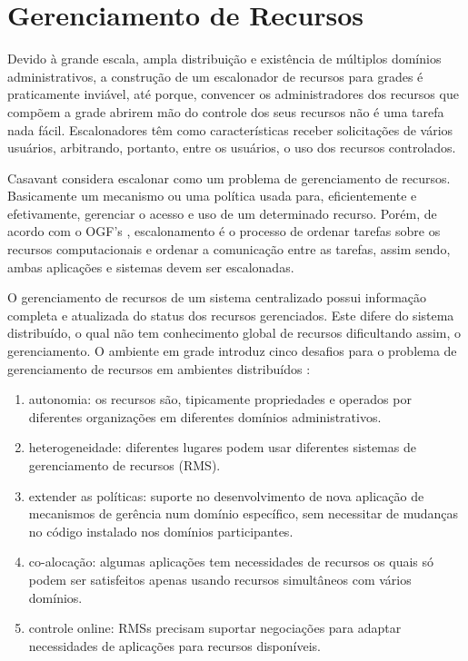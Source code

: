 \section{Gerenciamento de Recursos}

Devido à grande escala, ampla distribuição e existência de múltiplos domínios administrativos, a construção de um escalonador de recursos para grades é praticamente inviável, até porque, convencer os administradores dos recursos que compõem a grade abrirem mão do controle dos seus recursos não é uma tarefa nada fácil. Escalonadores têm como características receber solicitações de vários usuários, arbitrando, portanto, entre os usuários, o uso dos recursos controlados.  

Casavant \cite{Thomas1996} considera escalonar como um problema de gerenciamento de recursos. Basicamente um mecanismo ou uma política usada para, eficientemente e efetivamente, gerenciar o acesso e uso de um determinado recurso. Porém, de acordo com o OGF's \cite{M.2002}, escalonamento é o processo de ordenar tarefas sobre os recursos computacionais e ordenar a comunicação entre as tarefas, assim sendo, ambas aplicações e sistemas devem ser escalonadas. 

O gerenciamento de recursos de um sistema centralizado possui informação completa e atualizada do status dos recursos gerenciados. Este difere do sistema distribuído, o qual não tem conhecimento global de recursos dificultando assim, o gerenciamento. O ambiente em grade introduz cinco desafios para o problema de gerenciamento de recursos em ambientes distribuídos \cite{Karl1998}:

\begin{enumerate}
\item autonomia: os recursos são, tipicamente propriedades e operados por diferentes organizações em diferentes domínios administrativos.
\item heterogeneidade: diferentes lugares podem usar diferentes sistemas de gerenciamento de recursos (RMS).
\item extender as políticas: suporte no desenvolvimento de nova aplicação de mecanismos de gerência num domínio específico, sem necessitar de mudanças no código instalado nos domínios participantes.
\item co-alocação: algumas aplicações tem necessidades de recursos os quais só podem ser satisfeitos apenas usando recursos simultâneos com vários domínios.
\item controle online: RMSs precisam suportar negociações para adaptar necessidades de aplicações para recursos disponíveis.
\end{enumerate}

